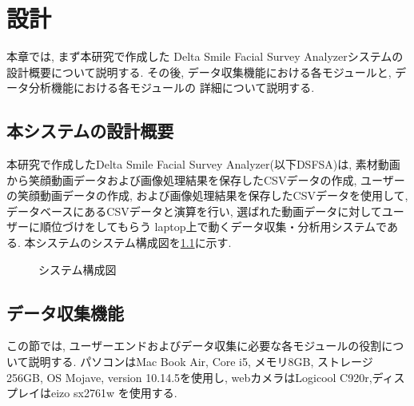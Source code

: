 \chapter{設計}
\label{chap:function}

本章では, まず本研究で作成した Delta Smile Facial Survey Analyzerシステムの
設計概要について説明する.
その後, データ収集機能における各モジュールと, データ分析機能における各モジュールの
詳細について説明する.

\section{本システムの設計概要}
本研究で作成したDelta Smile Facial Survey Analyzer(以下DSFSA)は,
素材動画から笑顔動画データおよび画像処理結果を保存したCSVデータの作成,
ユーザーの笑顔動画データの作成, および画像処理結果を保存したCSVデータを使用して,
データベースにあるCSVデータと演算を行い, 選ばれた動画データに対してユーザーに順位づけをしてもらう
laptop上で動くデータ収集・分析用システムである.
本システムのシステム構成図を\ref{fig:system_architecture}に示す.

\begin{figure}[htbp]
    \begin{center}
    \end{center}
    \caption{システム構成図}
    \label{fig:system_architecture}
\end{figure}

\section{データ収集機能}
この節では, ユーザーエンドおよびデータ収集に必要な各モジュールの役割について説明する.
パソコンはMac Book Air, Core i5, メモリ8GB, ストレージ256GB, OS Mojave, version 10.14.5を使用し,
webカメラはLogicool C920r,ディスプレイはeizo sx2761w を使用する.

